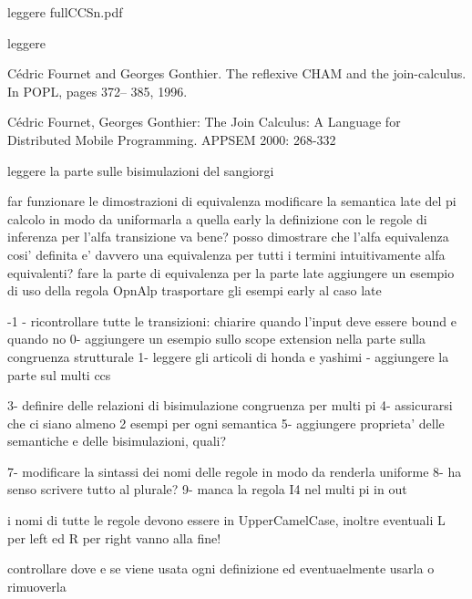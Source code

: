 
leggere fullCCSn.pdf

leggere 

Cédric Fournet and Georges Gonthier. The reflexive
CHAM and the join-calculus. In POPL, pages 372–
385, 1996.

Cédric Fournet, Georges Gonthier: The Join Calculus:
A Language for Distributed Mobile Programming.
APPSEM 2000: 268-332



leggere la parte sulle bisimulazioni del sangiorgi



















far funzionare le dimostrazioni di equivalenza
modificare la semantica late del pi calcolo in modo da uniformarla a quella early
la definizione con le regole di inferenza per l'alfa transizione va bene? posso dimostrare che l'alfa equivalenza cosi' definita e' davvero una equivalenza per tutti i termini intuitivamente alfa equivalenti?
fare la parte di equivalenza per la parte late
aggiungere un esempio di uso della regola OpnAlp
trasportare gli esempi early al caso late




-1 - ricontrollare tutte le transizioni: chiarire quando l'input deve essere bound e quando no
0- aggiungere un esempio sullo scope extension nella parte sulla congruenza strutturale
1- leggere gli articoli di honda e yashimi
 - aggiungere la parte sul multi ccs

3- definire delle relazioni di bisimulazione congruenza per multi pi
4- assicurarsi che ci siano almeno 2 esempi per ogni semantica
5- aggiungere proprieta' delle semantiche e delle bisimulazioni, quali?

7- modificare la sintassi dei nomi delle regole in modo da renderla uniforme
8- ha senso scrivere tutto al plurale?
9- manca la regola I4 nel multi pi in out


i nomi di tutte le regole devono essere in UpperCamelCase, inoltre eventuali L per left ed R per right vanno alla fine!

controllare dove e se viene usata ogni definizione ed eventuaelmente usarla o rimuoverla




